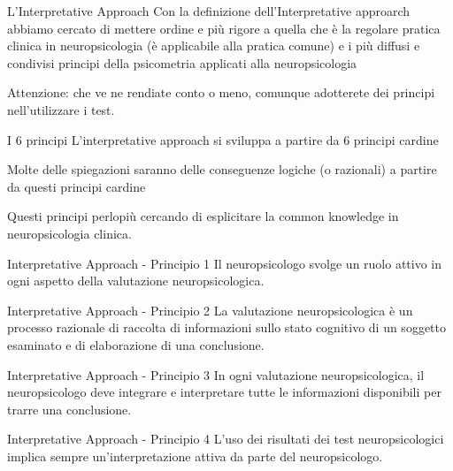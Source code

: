 \documentclass[
  ignorenonframetext,
]{beamer}
\begin{document}
\begin{frame}{L'Interpretative Approach}
\label{linterpretative-approach-1}
Con la definizione dell'Interpretative approarch abbiamo cercato di
mettere ordine e più rigore a quella che è la regolare pratica clinica
in neuropsicologia (è applicabile alla pratica comune) e i più diffusi e
condivisi principi della psicometria applicati alla neuropsicologia

Attenzione: che ve ne rendiate conto o meno, comunque adotterete dei
principi nell'utilizzare i test.
\end{frame}

\begin{frame}{I 6 principi}
\label{i-6-principi}
L'interpretative approach si sviluppa a partire da 6 principi cardine

Molte delle spiegazioni saranno delle conseguenze logiche (o razionali)
a partire da questi principi cardine

Questi principi perlopiù cercando di esplicitare la common knowledge in
neuropsicologia clinica.
\end{frame}

\begin{frame}{Interpretative Approach - Principio 1}
\label{interpretative-approach---principio-1}
Il neuropsicologo svolge un ruolo attivo in ogni aspetto della
valutazione neuropsicologica.
\end{frame}

\begin{frame}{Interpretative Approach - Principio 2}
\label{interpretative-approach---principio-2}
La valutazione neuropsicologica è un processo razionale di raccolta di
informazioni sullo stato cognitivo di un soggetto esaminato e di
elaborazione di una conclusione.
\end{frame}

\begin{frame}{Interpretative Approach - Principio 3}
\label{interpretative-approach---principio-3}
In ogni valutazione neuropsicologica, il neuropsicologo deve integrare e
interpretare tutte le informazioni disponibili per trarre una
conclusione.
\end{frame}

\begin{frame}{Interpretative Approach - Principio 4}
\label{interpretative-approach---principio-4}
L'uso dei risultati dei test neuropsicologici implica sempre
un'interpretazione attiva da parte del neuropsicologo.
\end{frame}
\end{document}
